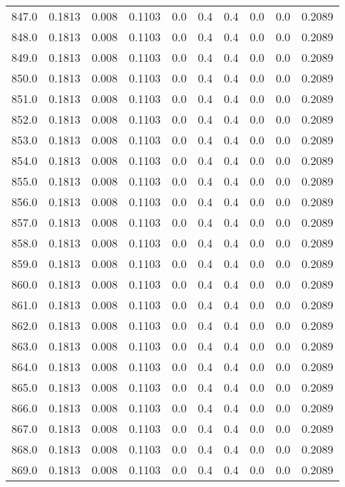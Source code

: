 \begin{longtable}{lrrrrrrrrr}
847.0 & 0.1813 & 0.008 & 0.1103 & 0.0 & 0.4 & 0.4 & 0.0 & 0.0 & 0.2089 \\
848.0 & 0.1813 & 0.008 & 0.1103 & 0.0 & 0.4 & 0.4 & 0.0 & 0.0 & 0.2089 \\
849.0 & 0.1813 & 0.008 & 0.1103 & 0.0 & 0.4 & 0.4 & 0.0 & 0.0 & 0.2089 \\
850.0 & 0.1813 & 0.008 & 0.1103 & 0.0 & 0.4 & 0.4 & 0.0 & 0.0 & 0.2089 \\
851.0 & 0.1813 & 0.008 & 0.1103 & 0.0 & 0.4 & 0.4 & 0.0 & 0.0 & 0.2089 \\
852.0 & 0.1813 & 0.008 & 0.1103 & 0.0 & 0.4 & 0.4 & 0.0 & 0.0 & 0.2089 \\
853.0 & 0.1813 & 0.008 & 0.1103 & 0.0 & 0.4 & 0.4 & 0.0 & 0.0 & 0.2089 \\
854.0 & 0.1813 & 0.008 & 0.1103 & 0.0 & 0.4 & 0.4 & 0.0 & 0.0 & 0.2089 \\
855.0 & 0.1813 & 0.008 & 0.1103 & 0.0 & 0.4 & 0.4 & 0.0 & 0.0 & 0.2089 \\
856.0 & 0.1813 & 0.008 & 0.1103 & 0.0 & 0.4 & 0.4 & 0.0 & 0.0 & 0.2089 \\
857.0 & 0.1813 & 0.008 & 0.1103 & 0.0 & 0.4 & 0.4 & 0.0 & 0.0 & 0.2089 \\
858.0 & 0.1813 & 0.008 & 0.1103 & 0.0 & 0.4 & 0.4 & 0.0 & 0.0 & 0.2089 \\
859.0 & 0.1813 & 0.008 & 0.1103 & 0.0 & 0.4 & 0.4 & 0.0 & 0.0 & 0.2089 \\
860.0 & 0.1813 & 0.008 & 0.1103 & 0.0 & 0.4 & 0.4 & 0.0 & 0.0 & 0.2089 \\
861.0 & 0.1813 & 0.008 & 0.1103 & 0.0 & 0.4 & 0.4 & 0.0 & 0.0 & 0.2089 \\
862.0 & 0.1813 & 0.008 & 0.1103 & 0.0 & 0.4 & 0.4 & 0.0 & 0.0 & 0.2089 \\
863.0 & 0.1813 & 0.008 & 0.1103 & 0.0 & 0.4 & 0.4 & 0.0 & 0.0 & 0.2089 \\
864.0 & 0.1813 & 0.008 & 0.1103 & 0.0 & 0.4 & 0.4 & 0.0 & 0.0 & 0.2089 \\
865.0 & 0.1813 & 0.008 & 0.1103 & 0.0 & 0.4 & 0.4 & 0.0 & 0.0 & 0.2089 \\
866.0 & 0.1813 & 0.008 & 0.1103 & 0.0 & 0.4 & 0.4 & 0.0 & 0.0 & 0.2089 \\
867.0 & 0.1813 & 0.008 & 0.1103 & 0.0 & 0.4 & 0.4 & 0.0 & 0.0 & 0.2089 \\
868.0 & 0.1813 & 0.008 & 0.1103 & 0.0 & 0.4 & 0.4 & 0.0 & 0.0 & 0.2089 \\
869.0 & 0.1813 & 0.008 & 0.1103 & 0.0 & 0.4 & 0.4 & 0.0 & 0.0 & 0.2089 \\

\end{longtable}
